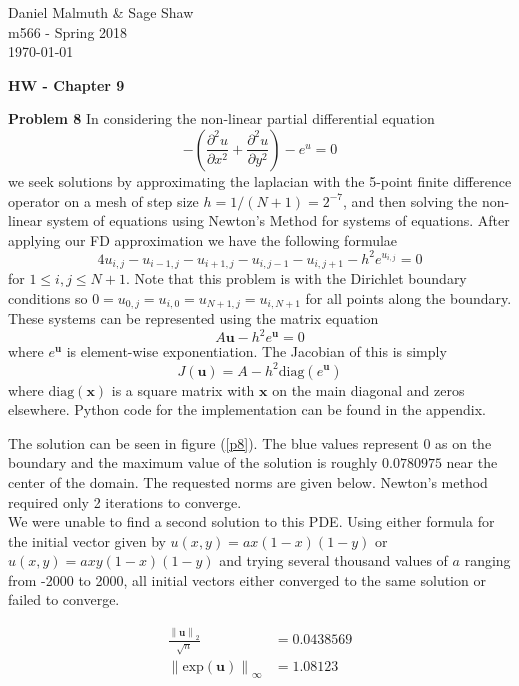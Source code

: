 \documentclass[12pt]{article}
\newcommand{\problem}[1]{\hspace{-4 ex} \large \textbf{Problem #1} }
\newcommand{\norm}[1]{\left\lVert#1\right\rVert}
\renewcommand{\vec}[1]{\mathbf{#1}}
\begin{document}
	\thispagestyle{empty}
	
	\begin{flushright}
		Daniel Malmuth \& Sage Shaw \\
		m566 - Spring 2018 \\
		\today
	\end{flushright}
	
{\large \textbf{HW - Chapter 9}}\bigbreak

\problem{8} In considering the non-linear partial differential equation
$$
-\left( \frac{\partial^2 u }{\partial x^2} + \frac{\partial^2 u }{\partial y^2} \right) - e^u = 0
$$
we seek solutions by approximating the laplacian with the 5-point finite difference operator on a mesh of step size $h=1/(N+1)=2^{-7}$, and then solving the non-linear system of equations using Newton's Method for systems of equations. After applying our FD approximation we have the following formulae
$$
4u_{i,j} - u_{i-1,j} - u_{i+1,j} - u_{i,j-1} - u_{i,j+1} - h^2e^{u_{i,j}} = 0
$$
for $1 \leq i,j \leq N+1$. Note that this problem is with the Dirichlet boundary conditions so $0 = u_{0,j} = u_{i,0} =  u_{N+1,j} = u_{i,N+1}$ for all points along the boundary. These systems can be represented using the matrix equation
$$
A\vec{u} - h^2e^{\vec{u}} = 0
$$
where $e^{\vec{u}}$ is element-wise exponentiation. The Jacobian of this is simply
$$
J(\vec{u}) = A - h^2 \text{diag}(e^{\vec{u}})
$$
where $\text{diag}(\vec{x})$ is a square matrix with $\vec{x}$ on the main diagonal and zeros elsewhere. Python code for the implementation can be found in the appendix. \bigbreak

The solution can be seen in figure (\ref{p8}). The blue values represent $0$ as on the boundary and the maximum value of the solution is roughly $0.0780975$ near the center of the domain. The requested norms are given below. Newton's method required only 2 iterations to converge. \\

We were unable to find a second solution to this PDE. Using either formula for the initial vector given by $u(x,y) = ax(1-x)(1-y)$ or $u(x,y) = axy(1-x)(1-y)$ and trying several thousand values of $a$ ranging from -2000 to 2000, all initial vectors either converged to the same solution or failed to converge.

\begin{align*}
\frac{\norm{\vec{u}}_2}{\sqrt{n}} &= 0.0438569 \\
\norm{\text{exp}(\vec{u})}_\infty &= 1.08123
\end{align*}
\end{document}
